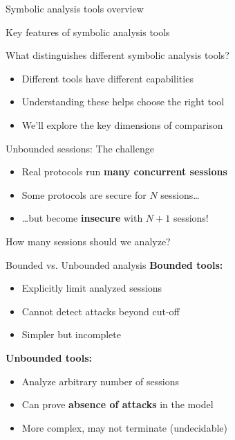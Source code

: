 \documentclass[aspectratio=169, lualatex, handout]{beamer}
\begin{document}
\begin{frame}{Symbolic analysis tools overview}
\end{frame}

\begin{frame}{Key features of symbolic analysis tools}
	\begin{center}
		\Large
		What distinguishes different symbolic analysis tools?
	\end{center}
	\vspace{1em}
	\begin{itemize}
		\item Different tools have different capabilities
		\item Understanding these helps choose the right tool
		\item We'll explore the key dimensions of comparison
	\end{itemize}
\end{frame}

\begin{frame}{Unbounded sessions: The challenge}
	\begin{itemize}
		\item Real protocols run \textbf{many concurrent sessions}
		\item Some protocols are secure for $N$ sessions\ldots
		\item \ldots but become \textbf{insecure} with $N+1$ sessions!
	\end{itemize}
	\vspace{1em}
	\begin{center}
		\Large
		How many sessions should we analyze?
	\end{center}
\end{frame}

\begin{frame}{Bounded vs. Unbounded analysis}
	\textbf{Bounded tools:}
	\begin{itemize}
		\item Explicitly limit analyzed sessions
		\item Cannot detect attacks beyond cut-off
		\item Simpler but incomplete
	\end{itemize}
	\vspace{0.5em}
	\textbf{Unbounded tools:}
	\begin{itemize}
		\item Analyze arbitrary number of sessions
		\item Can prove \textbf{absence of attacks} in the model
		\item More complex, may not terminate (undecidable)
	\end{itemize}
\end{frame}
\end{document}
